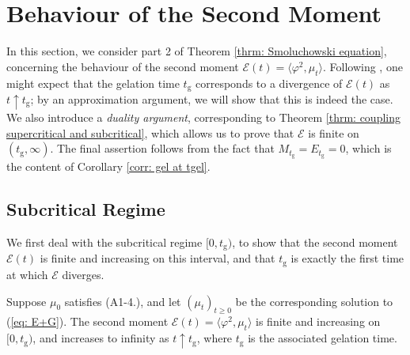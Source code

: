 \section{Behaviour of the Second Moment}
\label{sec: finiteness of second moment} In this section, we consider part 2 of Theorem \ref{thrm: Smoluchowski equation}, concerning the behaviour of the second moment $\mathcal{E}(t)=\langle \varphi^2, \mu_t\rangle$. Following \cite{N00}, one might expect that the gelation time $t_\mathrm{g}$ corresponds to a divergence of $\mathcal{E}(t)$ as $t\uparrow t_\mathrm{g}$; by an approximation argument, we will show that this is indeed the case. We also introduce a \emph{duality argument}, corresponding to Theorem \ref{thrm: coupling supercritical and subcritical}, which allows us to prove that $\mathcal{E}$ is finite on $(t_\mathrm{g}, \infty)$. The final assertion follows from the fact that $M_{t_\mathrm{g}}=E_{t_\mathrm{g}}=0$, which is the content of Corollary \ref{corr: gel at tgel}.
\subsection{Subcritical Regime} We first deal with the subcritical regime $[0, t_\mathrm{g})$, to show that the second moment $\mathcal{E}(t)$ is finite and increasing on this interval, and that $t_\mathrm{g}$ is exactly the first time at which $\mathcal{E}$ diverges.
\begin{lemma}\label{lemma: second moment before tgel} Suppose $\mu_0$ satisfies (A1-4.), and let $(\mu_t)_{t\ge 0}$ be the corresponding solution to (\ref{eq: E+G}). The second moment $\mathcal{E}(t)=\langle \varphi^2, \mu_t\rangle$ is finite and increasing on $[0, t_\mathrm{g})$, and increases to infinity as $t\uparrow t_\mathrm{g}$, where $t_\mathrm{g}$ is the associated gelation time. \end{lemma} 

